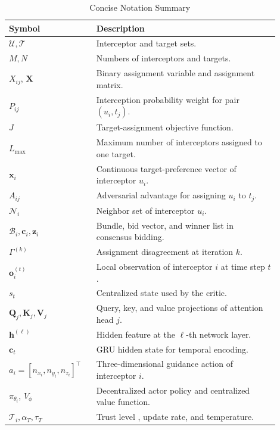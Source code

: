 \documentclass[lettersize,journal]{IEEEtran}
\providecommand{\DIFadd}[1]{{\protect\color{blue} #1}} %
\providecommand{\DIFdel}[1]{} %
\providecommand{\DIFaddFL}[1]{\DIFadd{#1}} %
\providecommand{\DIFdelFL}[1]{\DIFdel{#1}} %
\providecommand{\DIFaddbeginFL}{} %
\providecommand{\DIFaddendFL}{} %
\providecommand{\DIFdelbeginFL}{} %
\providecommand{\DIFdelendFL}{} %
\begin{document}
\begin{table}[!t]
\centering
\caption{Concise Notation Summary}
\label{tab:notation}
\renewcommand{\arraystretch}{1.15}
\footnotesize
\begin{tabular}{p{0.28\linewidth}p{0.62\linewidth}}
\toprule
Symbol & Description \\
\midrule
$\mathcal{U},\mathcal{T}$ & Interceptor and target sets. \\
$M,N$ & Numbers of interceptors and targets. \\
$X_{ij}$, $\mathbf{X}$ & Binary assignment variable and assignment matrix. \\
$P_{ij}$ & Interception probability weight for pair $(u_i,t_j)$. \\
$J$ & Target-assignment objective function. \\
$L_{\max}$ & Maximum number of interceptors assigned to one target. \\
$\mathbf{x}_i$ & Continuous target-preference vector of interceptor $u_i$. \\
$A_{ij}$ & Adversarial advantage for assigning $u_i$ to $t_j$. \\
$\mathcal{N}_i$ & Neighbor set of interceptor $u_i$. \\
$\mathcal{B}_i,\mathbf{c}_i,\mathbf{z}_i$ & Bundle, bid vector, and winner list in consensus bidding. \\
$\Gamma^{(k)}$ & Assignment disagreement at iteration $k$. \\
$\mathbf{o}_i^{(t)}$ & Local observation of interceptor $i$ at time step $t$. \\
$s_t$ & Centralized state used by the critic. \\
\DIFaddbeginFL \DIFaddFL{$\mathbf Q_j,\mathbf K_j,\mathbf V_j$ }& \DIFaddFL{Query, key, and value projections of attention head \(j\). }\\
\DIFaddendFL $\mathbf{h}^{(\ell)}$ & Hidden feature at the $\ell$-th network layer. \\
$\mathbf{c}_t$ & GRU hidden state for temporal encoding. \\
\DIFdelbeginFL \DIFdelFL{$a_i$ }\DIFdelendFL \DIFaddbeginFL \DIFaddFL{$a_i=[n_{x_i},n_{y_i},n_{z_i}]^\top$ }\DIFaddendFL & \DIFdelbeginFL \DIFdelFL{Continuous }\DIFdelendFL \DIFaddbeginFL \DIFaddFL{Three-dimensional }\DIFaddendFL guidance action of interceptor $i$. \\
$\pi_{\theta_i}$, $V_{\phi}$ & Decentralized actor policy and centralized value function. \\
\DIFdelbeginFL \DIFdelFL{$\mathcal{T}_i$ }\DIFdelendFL \DIFaddbeginFL \DIFaddFL{$\mathcal{T}_i,\alpha_T,\tau_T$ }\DIFaddendFL & Trust level\DIFdelbeginFL \DIFdelFL{controlling guided exploration}\DIFdelendFL \DIFaddbeginFL \DIFaddFL{, update rate, and temperature}\DIFaddendFL . \\

\end{tabular}
\end{table}
\end{document}
